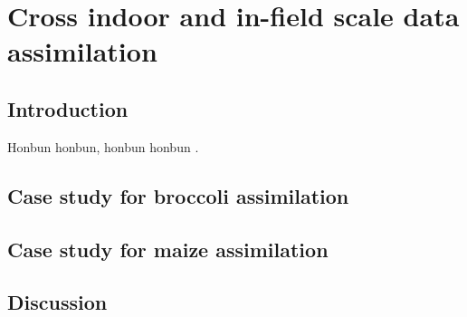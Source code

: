 \chapter{Cross indoor and in-field scale data assimilation}

\section{Introduction}

Honbun honbun, honbun honbun \citep{zhao_crop_2019}. 


\section{Case study for broccoli assimilation}


\section{Case study for maize assimilation}

\section{Discussion}